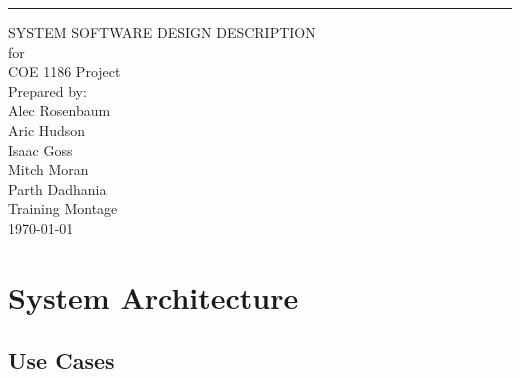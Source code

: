 \documentclass{scrreprt}
\begin{document}
\begin{flushright}
    \rule{16cm}{5pt}\vskip1cm
    \begin{bfseries}
        \Huge{SYSTEM SOFTWARE DESIGN DESCRIPTION}\\
        \vspace{.9cm}
        for\\
        \vspace{.9cm}
        COE 1186 Project\\
        \vspace{.9cm}
        \vspace{.9cm}
        Prepared by:\\
        Alec Rosenbaum\\
        Aric Hudson\\
        Isaac Goss\\
        Mitch Moran\\
	    Parth Dadhania\\
        \vspace{1.9cm}
        Training Montage\\
        \vspace{.9cm}
        \today\\
    \end{bfseries}
\end{flushright}

\tableofcontents

\chapter{System Architecture}

\section{Use Cases}
\end{document}
